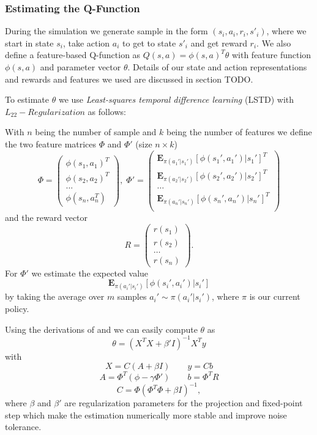 \documentclass[twoside]{article}
\begin{document}
\subsubsection{Estimating the Q-Function}
\label{sec:estimateq}

During the simulation we generate sample in the form $(s_i, a_i, r_i, s'_i)$,
where we start in state $s_i$, take action $a_i$ to get to state $s'_i$ and
get reward $r_i$. We also define a feature-based Q-function as $Q(s, a) =
\phi(s,a)^T \theta$ with feature function $\phi(s,a)$ and parameter vector
$\theta$. Details of our state and action representations and rewards and
features we used are discussed in section TODO.

To estimate $\theta$ we use \emph{Least-squares temporal difference
learning} (LSTD) with $L_{22}-Regularization$\cite{lstdRegularization} as
follows:

With $n$ being the number of sample and $k$ being the number of features
we define the two feature matrices $\Phi$ and $\Phi'$ (size $n\times k$)
$$
\Phi = \left(
\begin{array}{c}
    \phi(s_1,a_1)^T \\
    \phi(s_2,a_2)^T \\
    \dots \\
    \phi(s_n,a_n^T)
\end{array} \right), \;
\Phi' = \left(
\begin{array}{c}
    \mathbf{E}_{\pi(a_1'|s_1')} [\phi(s_1', a_1') | s_1']^T \\
    \mathbf{E}_{\pi(a_2'|s_2')} [\phi(s_2', a_2') | s_2']^T \\
    \dots \\
    \mathbf{E}_{\pi(a_n'|s_n')} [\phi(s_n', a_n') | s_n']^T \\
\end{array} \right)
$$
and the reward vector
$$
R = \left(
\begin{array}{c}
    r(s_1) \\
    r(s_2) \\
    \dots \\
    r(s_n)
\end{array} \right).
$$
For $\Phi'$ we estimate the expected value
$$
\mathbf{E}_{\pi(a_i'|s_i')} [\phi(s_i', a_i') | s_i']
$$
by taking the average over $m$ samples $a_i' \sim \pi(a_i'|s_i')$, where $\pi$
is our current policy.

Using the derivations of \cite{lspi} and \cite{lstdRegularization} we can easily
compute $\theta$ as
$$
\theta = (X^TX+\beta'I)^{-1}X^Ty
$$
with
$$X = C(A+\beta I) \qquad y=Cb$$
$$A = \Phi^T(\phi-\gamma \Phi') \qquad b=\Phi^T R$$
$$C = \Phi(\Phi^T\Phi+\beta I)^{-1},$$
where $\beta$ and $\beta'$ are regularization parameters for the projection and
fixed-point step which make the estimation numerically more stable and improve
noise tolerance.
\end{document}
